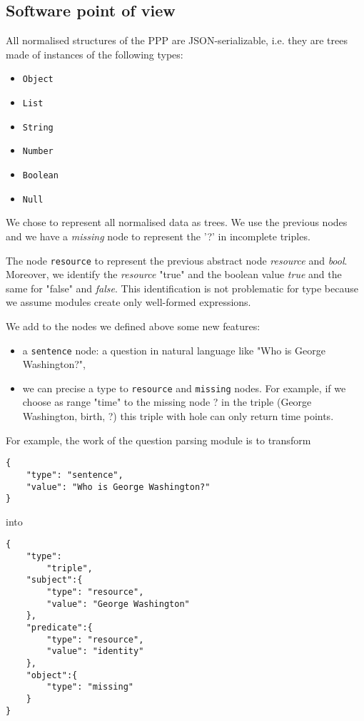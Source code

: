 \subsection{Software point of view}

All normalised structures of the PPP are JSON-serializable, i.e. they are trees made of instances of the following types:
\begin{itemize}
    \item \texttt{Object}
    \item \texttt{List}
    \item \texttt{String}
    \item \texttt{Number}
    \item \texttt{Boolean}
    \item \texttt{Null}
\end{itemize}

We chose to represent all normalised data as trees. We use the previous nodes and we have a \textsl{missing} node to represent the '?' in incomplete triples.

The node \texttt{resource} to represent the previous abstract node \textsl{resource} and \textsl{bool}. Moreover, we identify the \textsl{resource} "true" and the boolean value \textsl{true} and the same for "false" and \textsl{false}. This identification is not problematic for type because we assume modules create only well-formed expressions.

We add to the nodes we defined above some new features:
\begin{itemize}
    \item a \texttt{sentence} node: a question in natural language like "Who is George Washington?",
    \item we can precise a type to \texttt{resource} and \texttt{missing} nodes. For example, if we choose as range "time" to the missing node ? in the triple (George Washington, birth, ?) this triple with hole can only return time points.
\end{itemize}

For example, the work of the question parsing module is to transform 
\begin{verbatim}
{
    "type": "sentence", 
    "value": "Who is George Washington?"
}
\end{verbatim}
into 
\begin{verbatim}
{
    "type":
        "triple",
    "subject":{
        "type": "resource",
        "value": "George Washington"
    },
    "predicate":{
        "type": "resource",
        "value": "identity"
    },
    "object":{
        "type": "missing"
    }
}
\end{verbatim}

